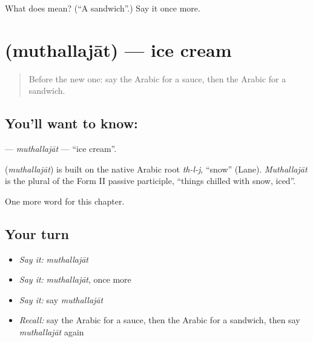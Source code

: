 \begin{tcolorbox}[breakable,colback=teal!4,colframe=teal!35!black,title={Before you move on}]
What does  mean? (\textquotedblleft{}A sandwich\textquotedblright{}.) Say it once more.
\end{tcolorbox}
\section[\texorpdfstring{\ar{مثلجات} (muthallajāt)}{مثلجات (muthallajāt)}]{ (muthallajāt) — ice cream}

\label{lesson:AR-C182-muthallajat}



\begin{quote}
Before the new one: say the Arabic for a sauce, then the Arabic for a sandwich.
\end{quote}

\subsection*{You'll want to know: }
\textbf{} — \emph{muthallajāt} — \textquotedblleft{}ice cream\textquotedblright{}.

\begin{cousinweb}
\textbf{} (\emph{muthallajāt}) is built on the native Arabic root \emph{th-l-j}, \textquotedblleft{}snow\textquotedblright{} (Lane). \emph{Muthallajāt} is the plural of the Form II passive participle, \textquotedblleft{}things chilled with snow, iced\textquotedblright{}.
\end{cousinweb}

\begin{grammarlens}[title={What you've built}]
One more word for this chapter.
\end{grammarlens}

\subsection*{Your turn}
\begin{itemize}
\raggedright
  \item \emph{Say it:} \emph{muthallajāt}
  \item \emph{Say it:} \emph{muthallajāt}, once more
  \item \emph{Say it:} say \emph{muthallajāt}
  \item \emph{Recall:} say the Arabic for a sauce, then the Arabic for a sandwich, then say \emph{muthallajāt} again
\end{itemize}

